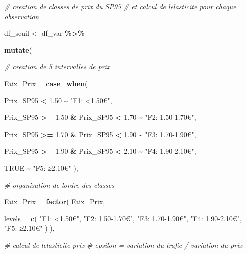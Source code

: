 \documentclass[
]{article}
\newenvironment{Shaded}{\begin{snugshade}}{\end{snugshade}}
\newcommand{\AttributeTok}[1]{\textcolor[rgb]{0.13,0.29,0.53}{#1}}
\newcommand{\CommentTok}[1]{\textcolor[rgb]{0.56,0.35,0.01}{\textit{#1}}}
\newcommand{\ConstantTok}[1]{\textcolor[rgb]{0.56,0.35,0.01}{#1}}
\newcommand{\FloatTok}[1]{\textcolor[rgb]{0.00,0.00,0.81}{#1}}
\newcommand{\FunctionTok}[1]{\textcolor[rgb]{0.13,0.29,0.53}{\textbf{#1}}}
\newcommand{\NormalTok}[1]{#1}
\newcommand{\OtherTok}[1]{\textcolor[rgb]{0.56,0.35,0.01}{#1}}
\newcommand{\SpecialCharTok}[1]{\textcolor[rgb]{0.81,0.36,0.00}{\textbf{#1}}}
\newcommand{\StringTok}[1]{\textcolor[rgb]{0.31,0.60,0.02}{#1}}
\begin{document}
\begin{Shaded}
\begin{Highlighting}[]
\CommentTok{\# creation de classes de prix du SP95}
\CommentTok{\# et calcul de l\textquotesingle{}elasticite pour chaque observation}

\NormalTok{df\_seuil }\OtherTok{\textless{}{-}}\NormalTok{ df\_var }\SpecialCharTok{\%\textgreater{}\%}

  \FunctionTok{mutate}\NormalTok{(}

    \CommentTok{\# creation de 5 intervalles de prix}

    \AttributeTok{Faix\_Prix =} \FunctionTok{case\_when}\NormalTok{(}

\NormalTok{      Prix\_SP95 }\SpecialCharTok{\textless{}} \FloatTok{1.50} \SpecialCharTok{\textasciitilde{}} \StringTok{"F1: \textless{}1.50€"}\NormalTok{,}

\NormalTok{      Prix\_SP95 }\SpecialCharTok{\textgreater{}=} \FloatTok{1.50} \SpecialCharTok{\&}\NormalTok{ Prix\_SP95 }\SpecialCharTok{\textless{}} \FloatTok{1.70} \SpecialCharTok{\textasciitilde{}} \StringTok{"F2: 1.50{-}1.70€"}\NormalTok{,}

\NormalTok{      Prix\_SP95 }\SpecialCharTok{\textgreater{}=} \FloatTok{1.70} \SpecialCharTok{\&}\NormalTok{ Prix\_SP95 }\SpecialCharTok{\textless{}} \FloatTok{1.90} \SpecialCharTok{\textasciitilde{}} \StringTok{"F3: 1.70{-}1.90€"}\NormalTok{,}

\NormalTok{      Prix\_SP95 }\SpecialCharTok{\textgreater{}=} \FloatTok{1.90} \SpecialCharTok{\&}\NormalTok{ Prix\_SP95 }\SpecialCharTok{\textless{}} \FloatTok{2.10} \SpecialCharTok{\textasciitilde{}} \StringTok{"F4: 1.90{-}2.10€"}\NormalTok{,}

      \ConstantTok{TRUE} \SpecialCharTok{\textasciitilde{}} \StringTok{"F5: ≥2.10€"}
\NormalTok{    ),}

    \CommentTok{\# organisation de l\textquotesingle{}ordre des classes}

    \AttributeTok{Faix\_Prix =} \FunctionTok{factor}\NormalTok{(}
\NormalTok{      Faix\_Prix,}

      \AttributeTok{levels =} \FunctionTok{c}\NormalTok{(}
        \StringTok{"F1: \textless{}1.50€"}\NormalTok{,}
        \StringTok{"F2: 1.50{-}1.70€"}\NormalTok{,}
        \StringTok{"F3: 1.70{-}1.90€"}\NormalTok{,}
        \StringTok{"F4: 1.90{-}2.10€"}\NormalTok{,}
        \StringTok{"F5: ≥2.10€"}
\NormalTok{      )}
\NormalTok{    ),}

    \CommentTok{\# calcul de l\textquotesingle{}elasticite{-}prix}
    \CommentTok{\# epsilon = variation du trafic / variation du prix}


\end{Highlighting}
\end{Shaded}
\end{document}
